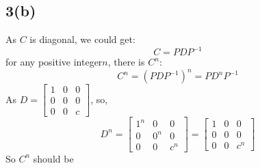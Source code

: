 \documentclass{article}
\begin{document}
\subsection*{3(b)}
As $C$ is diagonal, we could get:
$$
C = PDP^{-1}
$$
for any positive integer$n$, there is $C^{n}$:
$$
C^{n} = (PDP^{-1})^{n} = PD^{n}P^{-1}
$$
As $D = \begin{bmatrix}
    1 & 0 & 0 \\
    0 & 0 & 0 \\
    0 & 0 & c
\end{bmatrix}$,
so,
$$
D^{n} = 
\begin{bmatrix}
    1^{n} & 0 & 0 \\
    0 & 0^{n} & 0 \\
    0 & 0 & c^{n}
\end{bmatrix}
=
\begin{bmatrix}
    1 & 0 & 0 \\
    0 & 0 & 0 \\
    0 & 0 & c^{n}
\end{bmatrix}
$$
So $C^{n}$ should be
\end{document}
